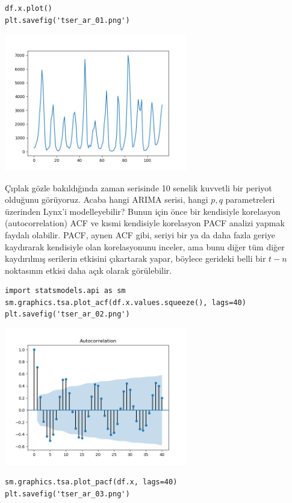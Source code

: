 \documentclass[12pt,fleqn]{article}\usepackage{../../common}
\begin{document}
\begin{verbatim}
df.x.plot()
plt.savefig('tser_ar_01.png')
\end{verbatim}

\includegraphics[height=6cm]{tser_ar_01.png}

Çıplak gözle bakıldığında zaman serisinde 10 senelik kuvvetli bir periyot
olduğunu görüyoruz. Acaba hangi ARIMA serisi, hangi $p,q$ parametreleri
üzerinden Lynx'i modelleyebilir? Bunun için önce bir kendisiyle korelasyon
(autocorrelation) ACF ve kısmi kendisiyle korelasyon PACF analizi yapmak
faydalı olabilir. PACF, aynen ACF gibi, seriyi bir ya da daha fazla geriye
kaydırarak kendisiyle olan korelasyonunu inceler, ama bunu diğer tüm diğer
kaydırılmış serilerin etkisini çıkartarak yapar, böylece gerideki belli
bir $t-n$ noktasının etkisi daha açık olarak görülebilir. 

\begin{verbatim}
import statsmodels.api as sm
sm.graphics.tsa.plot_acf(df.x.values.squeeze(), lags=40)
plt.savefig('tser_ar_02.png')
\end{verbatim}

\includegraphics[height=6cm]{tser_ar_02.png}

\begin{verbatim}
sm.graphics.tsa.plot_pacf(df.x, lags=40)
plt.savefig('tser_ar_03.png')
\end{verbatim}
\end{document}

